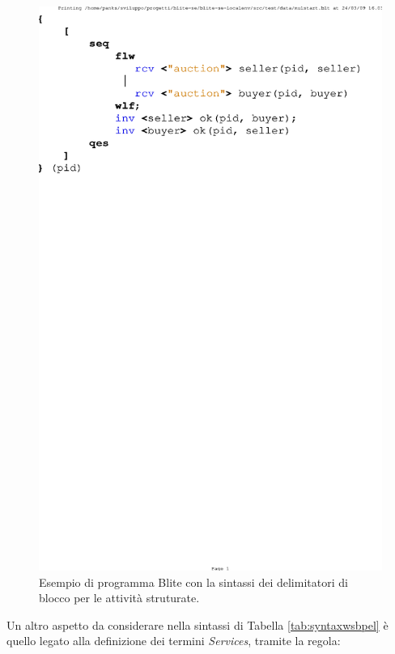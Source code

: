 \begin{figure}[!t]
\begin{center}
  \includegraphics[scale=0.80,clip]{linguaggio/dia/blt1}
   \caption[Codice Blite, esempio delimitatori di blocco]{Esempio di programma
   Blite con la sintassi dei delimitatori di blocco per le attività struturate.}
  \label{fig:lin:blt1}
\end{center}
\end{figure}


Un altro aspetto da considerare nella sintassi di Tabella \ref{tab:syntaxwsbpel}
è quello legato alla definizione dei termini \textit{Services}, tramite la
regola:

